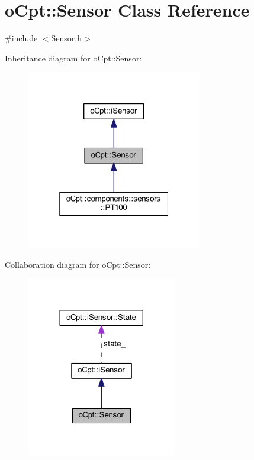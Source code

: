 \hypertarget{classo_cpt_1_1_sensor}{}\section{o\+Cpt\+:\+:Sensor Class Reference}
\label{classo_cpt_1_1_sensor}


{\ttfamily \#include $<$Sensor.\+h$>$}



Inheritance diagram for o\+Cpt\+:\+:Sensor\+:
\nopagebreak
\begin{figure}[H]
\begin{center}
\leavevmode
\includegraphics[width=217pt]{classo_cpt_1_1_sensor__inherit__graph}
\end{center}
\end{figure}


Collaboration diagram for o\+Cpt\+:\+:Sensor\+:
\nopagebreak
\begin{figure}[H]
\begin{center}
\leavevmode
\includegraphics[width=185pt]{classo_cpt_1_1_sensor__coll__graph}
\end{center}
\end{figure}
